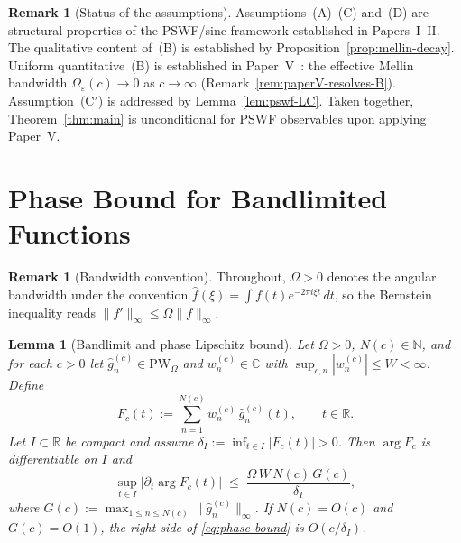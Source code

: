 \documentclass[12pt,a4paper]{amsart}
\newtheorem{lemma}[theorem]{Lemma}
\theoremstyle{definition}
\newtheorem{remark}[theorem]{Remark}
\newcommand{\PW}{\mathrm{PW}_\Omega}
\begin{document}
\begin{remark}[Status of the assumptions]
\label{rem:status}
Assumptions~(A)--(C) and~(D) are structural properties
of the PSWF/sinc framework established in Papers~I--II.
The qualitative content of~(B) is established by
Proposition~\ref{prop:mellin-decay}.
Uniform quantitative~(B) is established in
Paper~V~\cite{PaperV}: the effective Mellin bandwidth
$\Omega_\varepsilon(c) \to 0$ as $c \to \infty$
(Remark~\ref{rem:paperV-resolves-B}).
Assumption~(C$'$) is addressed by Lemma~\ref{lem:pswf-LC}.
Taken together, Theorem~\ref{thm:main} is unconditional
for PSWF observables upon applying Paper~V.
\end{remark}

\section{Phase Bound for Bandlimited Functions}
\label{sec:lemma1}

\begin{remark}[Bandwidth convention]
\label{rem:omega-convention}
Throughout, $\Omega > 0$ denotes the angular bandwidth
under the convention
$\hat{f}(\xi)
= \int f(t)e^{-2\pi i\xi t}\,dt$,
so the Bernstein inequality reads
$\|f'\|_\infty \le \Omega \|f\|_\infty$.
\end{remark}

\begin{lemma}[Bandlimit and phase Lipschitz bound]
\label{lem:bandlimit-phase}
Let $\Omega > 0$, $N(c) \in \mathbb{N}$, and for each
$c > 0$ let $\widehat{g}_n^{(c)} \in \PW$ and
$w_n^{(c)} \in \mathbb{C}$ with
$\sup_{c,n} |w_n^{(c)}| \le W < \infty$. Define
\begin{equation}
F_c(t)
:= \sum_{n=1}^{N(c)}
w_n^{(c)}\,\widehat{g}_n^{(c)}(t),
\qquad t \in \mathbb{R}.
\label{eq:Fc-def}
\end{equation}
Let $I \subset \mathbb{R}$ be compact and assume
$\delta_I := \inf_{t \in I} |F_c(t)| > 0$.
Then $\arg F_c$ is differentiable on $I$ and
\begin{equation}
\sup_{t \in I}
\bigl|\partial_t \arg F_c(t)\bigr|
\;\le\;
\frac{\Omega\,W\,N(c)\,G(c)}{\delta_I},
\label{eq:phase-bound}
\end{equation}
where $G(c) := \max_{1 \le n \le N(c)}
\|\widehat{g}_n^{(c)}\|_\infty$.
If $N(c) = O(c)$ and $G(c) = O(1)$, the right side
of \eqref{eq:phase-bound} is $O(c/\delta_I)$.
\end{lemma}
\end{document}
